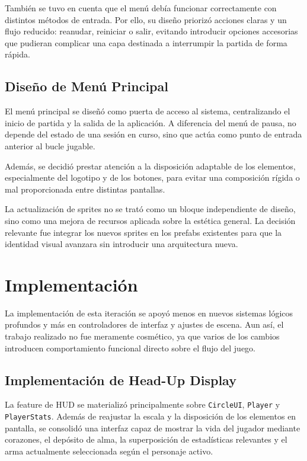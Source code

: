 También se tuvo en cuenta que el menú debía funcionar correctamente con distintos métodos
de entrada. Por ello, su diseño priorizó acciones claras y un flujo reducido: reanudar,
reiniciar o salir, evitando introducir opciones accesorias que pudieran complicar una capa
destinada a interrumpir la partida de forma rápida.

\subsection{Diseño de Menú Principal}
El menú principal se diseñó como puerta de acceso al sistema, centralizando el inicio de
partida y la salida de la aplicación. A diferencia del menú de pausa, no depende del estado
de una sesión en curso, sino que actúa como punto de entrada anterior al bucle jugable.

Además, se decidió prestar atención a la disposición adaptable de los elementos, especialmente
del logotipo y de los botones, para evitar una composición rígida o mal proporcionada entre
distintas pantallas.

La actualización de sprites no se trató como un bloque independiente de diseño, sino como
una mejora de recursos aplicada sobre la estética general. La decisión relevante fue
integrar los nuevos sprites en los prefabs existentes para que la identidad visual avanzara
sin introducir una arquitectura nueva.

\section{Implementación}
La implementación de esta iteración se apoyó menos en nuevos sistemas lógicos profundos y
más en controladores de interfaz y ajustes de escena. Aun así, el trabajo realizado no fue
meramente cosmético, ya que varios de los cambios introducen comportamiento funcional
directo sobre el flujo del juego.

\subsection{Implementación de Head-Up Display}
La feature de HUD se materializó principalmente sobre \texttt{CircleUI}, \texttt{Player} y
\texttt{PlayerStats}. Además de reajustar la escala y la disposición de los elementos en
pantalla, se consolidó una interfaz capaz de mostrar la vida del jugador mediante corazones,
el depósito de alma, la superposición de estadísticas relevantes y el arma actualmente
seleccionada según el personaje activo.

